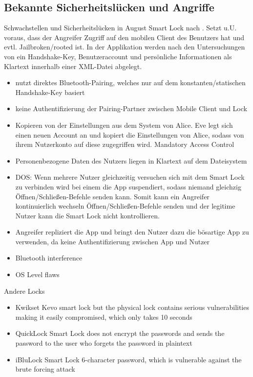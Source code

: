 \subsection{Bekannte Sicherheitslücken und Angriffe}
\label{sec:analysis_weaknesses}

	Schwachstellen und Sicherheitslücken in August Smart Lock nach \citeauthor{Ye2017}.
	Setzt u.U. voraus, dass der Angreifer Zugriff auf den mobilen Client des Benutzers hat und evtl. Jailbroken/rooted ist.
	In der Applikation werden nach den Untersuchungen von \citeauthor{Ye2017} ein Handshake-Key, Benutzeraccount und persönliche Informationen als Klartext innerhalb einer XML-Datei abgelegt.
	\begin{itemize}
		\item nutzt direktes Bluetooth-Pairing, welches nur auf dem konstanten/statischen Handshake-Key basiert
		\item keine Authentifizierung der Pairing-Partner zwischen Mobile Client und Lock
		\item Kopieren von der Einstellungen aus dem System von Alice.
		    Eve legt sich einen neuen Account an und kopiert die Einstellungen von Alice, sodass von ihrem Nutzerkonto auf diese zugegriffen wird. \textrightarrow Mandatory Access Control
		\item Personenbezogene Daten des Nutzers liegen in Klartext auf dem Dateisystem
		\item DOS: Wenn mehrere Nutzer gleichzeitig versuchen sich mit dem Smart Lock zu verbinden wird bei einem die App suspendiert, sodass niemand gleichzig Öffnen/Schließen-Befehle senden kann.
		    Somit kann ein Angreifer kontinuierlich wechseln Öffnen/Schließen-Befehle senden und der legitime Nutzer kann die Smart Lock nicht kontrollieren.
	   \item Angreifer repliziert die App und bringt den Nutzer dazu die bösartige App zu verwenden, da keine Authentifizierung zwischen App und Nutzer
	   \item Bluetooth interference
	   \item OS Level flaws
	\end{itemize}

	Andere Locks
	\begin{itemize}
		\item Kwikset Kevo smart lock but the physical lock contains serious vulnerabilities making it easily compromised, which only takes 10 seconds\cite{Ye2017}
		\item QuickLock Smart Lock does not encrypt the passwords and sends the password to the user who forgets the password in plaintext\cite{Ye2017}
		\item iBluLock Smart Lock 6-character password, which is vulnerable against the brute forcing attack\cite{Ye2017}
	\end{itemize}
	
